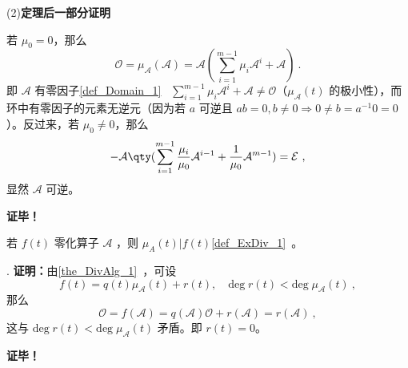 (2)\textbf{定理后一部分证明}

若 $\mu_0= 0$，那么
\begin{equation}
\mathcal O=\mu_\mathcal{A}(\mathcal A)=\mathcal A(\sum_{i=1}^{m-1}\mu_i\mathcal A^i+\mathcal{A})~.
\end{equation}
即 $\mathcal{A}$ 有零因子\autoref{def_Domain_1}~ $\sum\limits_{i=1}^{m-1}\mu_i\mathcal A^i+\mathcal{A}\neq \mathcal O$（$\mu_\mathcal{A}(t)$ 的极小性），而环中有零因子的元素无逆元（因为若 $a$ 可逆且 $ab=0,b\neq 0\Rightarrow 0\neq b=a^{-1}0=0$）。反过来，若 $\mu_0\neq0$，那么
\begin{equation}
-\mathcal{A}\qty(\sum_{i=1}^{m-1}\frac{\mu_i}{\mu_0}\mathcal A^{i-1}+\frac{1}{\mu_0}\mathcal A^{m-1})=\mathcal{E}~,
\end{equation}
显然 $\mathcal{A}$ 可逆。

\textbf{证毕！}
\begin{theorem}{}
若 $f(t)$ 零化算子 $\mathcal A$ ，则 $\mu_{A}(t)|f(t)$\autoref{def_ExDiv_1}~。
\end{theorem}.
\textbf{证明：}由\autoref{the_DivAlg_1}~，可设 
\begin{equation}
f(t)=q(t)\mu_\mathcal{A}(t)+r(t),\quad\mathrm{deg}\;r(t)<\mathrm{deg}\;\mu_{\mathcal{A}}(t)~,
\end{equation}
那么
\begin{equation}
\mathcal O=f(\mathcal A)=q(\mathcal A)\mathcal O+r(\mathcal A)=r(\mathcal A)~,
\end{equation}
这与 $\mathrm{deg}\;r(t)<\mathrm{deg}\;\mu_{\mathcal A}(t)$ 矛盾。即 $r(t)=0$。

\textbf{证毕！}
